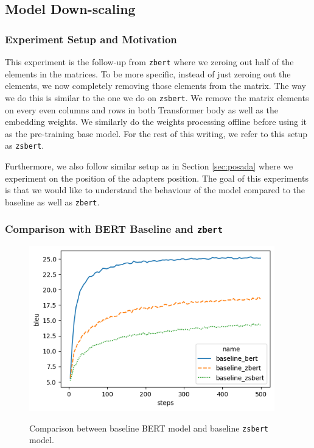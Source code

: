 \subsection{Model Down-scaling}
\subsubsection{Experiment Setup and Motivation}
This experiment is the follow-up from \texttt{zbert} where we zeroing out half of the elements in the matrices. To be more specific, instead of just zeroing out the elements, we now completely removing those elements from the matrix. The way we do this is similar to the one we do on \texttt{zsbert}. We remove the matrix elements on every even columns and rows in both Transformer body as well as the embedding weights. We similarly do the weights processing offline before using it as the pre-training base model. For the rest of this writing, we refer to this setup as \texttt{zsbert}.

Furthermore, we also follow similar setup as in Section \ref{sec:posada} where we experiment on the position of the adapters position. The goal of this experiments is that we would like to understand the behaviour of the model compared to the baseline as well as \texttt{zbert}.

\subsubsection{Comparison with BERT Baseline and \texttt{zbert}}

\begin{figure}[h]
    {\includegraphics[width=0.95\textwidth]{img/baseline_zsbert.png}}
    \centering
    \caption{Comparison between baseline BERT model and baseline \texttt{zsbert} model.}
    \label{img:baseline_zsbert}
\end{figure}


